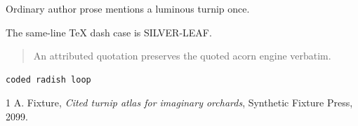 \documentclass{article}
\begin{document}
Ordinary author prose mentions a luminous turnip once.

The same-line TeX dash case is SILVER-LEAF.

\begin{quote}
An attributed quotation preserves the quoted acorn engine verbatim.
\end{quote}

\begin{verbatim}
coded radish loop
\end{verbatim}

\begin{thebibliography}{1}
A. Fixture, \emph{Cited turnip atlas for imaginary orchards}, Synthetic Fixture Press, 2099.
\end{thebibliography}
\end{document}

